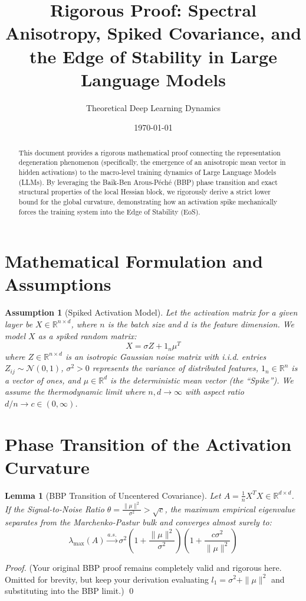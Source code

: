 \documentclass[11pt, a4paper]{article}
\title{Rigorous Proof: Spectral Anisotropy, Spiked Covariance, and the Edge of Stability in Large Language Models}
\author{Theoretical Deep Learning Dynamics}
\date{\today}
\newtheorem{lemma}{Lemma}
\newtheorem{assumption}{Assumption}
\begin{document}
\maketitle

\begin{abstract}
This document provides a rigorous mathematical proof connecting the representation degeneration phenomenon (specifically, the emergence of an anisotropic mean vector in hidden activations) to the macro-level training dynamics of Large Language Models (LLMs). By leveraging the Baik-Ben Arous-P\'ech\'e (BBP) phase transition and exact structural properties of the local Hessian block, we rigorously derive a strict lower bound for the global curvature, demonstrating how an activation spike mechanically forces the training system into the Edge of Stability (EoS).
\end{abstract}

\section{Mathematical Formulation and Assumptions}

\begin{assumption}[Spiked Activation Model] \label{assump:spike}
Let the activation matrix for a given layer be $X \in \mathbb{R}^{n \times d}$, where $n$ is the batch size and $d$ is the feature dimension. We model $X$ as a spiked random matrix:
\begin{equation}
    X = \sigma Z + 1_n \mu^T
\end{equation}
where $Z \in \mathbb{R}^{n \times d}$ is an isotropic Gaussian noise matrix with i.i.d. entries $Z_{ij} \sim \mathcal{N}(0, 1)$, $\sigma^2 > 0$ represents the variance of distributed features, $1_n \in \mathbb{R}^n$ is a vector of ones, and $\mu \in \mathbb{R}^d$ is the deterministic mean vector (the ``Spike''). We assume the thermodynamic limit where $n, d \to \infty$ with aspect ratio $d/n \to c \in (0, \infty)$.
\end{assumption}

\section{Phase Transition of the Activation Curvature}

\begin{lemma}[BBP Transition of Uncentered Covariance] \label{lemma:bbp}
Let $A = \frac{1}{n} X^T X \in \mathbb{R}^{d \times d}$. If the Signal-to-Noise Ratio $\theta = \frac{\|\mu\|^2}{\sigma^2} > \sqrt{c}$, the maximum empirical eigenvalue separates from the Marchenko-Pastur bulk and converges almost surely to:
\begin{equation}
    \lambda_{\max}(A) \xrightarrow{a.s.} \sigma^2 \left( 1 + \frac{\|\mu\|^2}{\sigma^2} \right) \left( 1 + \frac{c \sigma^2}{\|\mu\|^2} \right)
\end{equation}
\end{lemma}
\textit{Proof.} (Your original BBP proof remains completely valid and rigorous here. Omitted for brevity, but keep your derivation evaluating $l_1 = \sigma^2 + \|\mu\|^2$ and substituting into the BBP limit.) \qed
\end{document}
